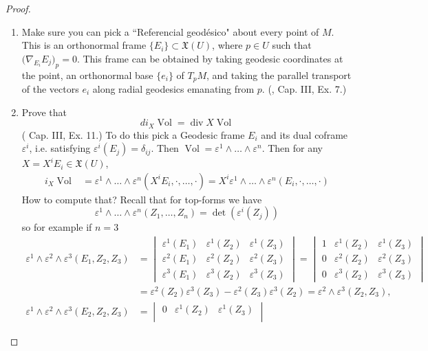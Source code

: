 \begin{proof}\leavevmode
\begin{enumerate}[label=\textbf{Step \arabic*}]
\item Make sure you can pick a ``Referencial geodésico" about every point of \(M\). This is an orthonormal frame \(\{E_i\} \subset \mathfrak{X}(U)\), where \(p \in U\) such that \(\Big(\nabla_{E_i}E_j\Big)_p=0\). This frame can be obtained by taking geodesic coordinates at the point, an orthonormal base \(\{e_i\}\) of \(T_pM\), and taking the parallel transport of the vectors \(e_i\) along radial geodesics emanating from \(p\). (\cite{doc}, Cap. III, Ex. 7.)

\item Prove that \[di_X \operatorname{Vol}=\operatorname{div}X \operatorname{Vol}\] (\cite{doc} Cap. III, Ex. 11.) To do this pick a Geodesic frame \(E_i\) and its dual coframe \(\varepsilon^i\), i.e. satisfying \(\varepsilon^i(E_j)=\delta_{ij}\). Then \(\operatorname{Vol}=\varepsilon^1 \wedge \ldots \wedge \varepsilon^n\). Then for any \(X=X^iE_i \in \mathfrak{X}(U)\),
	\begin{align*}
	i_X\operatorname{Vol}&=\varepsilon^1\wedge\ldots\wedge\varepsilon^n(X^iE_i,\cdot,\ldots,\cdot)=X^i\varepsilon^1\wedge\ldots\wedge\varepsilon^n(E_i,\cdot,\ldots,\cdot)
	\end{align*}
	How to compute that? Recall that for top-forms we have
	\[\varepsilon^1\wedge\ldots\wedge\varepsilon^n(Z_1,\ldots,Z_n)=\det(\varepsilon^i(Z_j))\]
	so for example if \(n=3\)
	\begin{align*}\varepsilon^1\wedge \varepsilon^2\wedge\varepsilon^3(E_1,Z_2,Z_3)&=\begin{vmatrix} \varepsilon^1(E_1)&\varepsilon^1(Z_2) &\varepsilon^1(Z_3)\\
\varepsilon^2(E_1)&\varepsilon^2(Z_2)&\varepsilon^2(Z_3)\\
\varepsilon^3(E_1)&\varepsilon^3(Z_2)&\varepsilon^3(Z_3)
	\end{vmatrix}=\begin{vmatrix} 1&\varepsilon^1(Z_2) &\varepsilon^1(Z_3)\\
0&\varepsilon^2(Z_2)&\varepsilon^2(Z_3)\\
0&\varepsilon^3(Z_2)&\varepsilon^3(Z_3)
	\end{vmatrix}\\
	&=\varepsilon^2(Z_2)\varepsilon^3(Z_3)-\varepsilon^2(Z_3)\varepsilon^3(Z_2)=\varepsilon^2\wedge\varepsilon^3(Z_2,Z_3),\\
	\varepsilon^1\wedge\varepsilon^2\wedge\varepsilon^3(E_2,Z_2,Z_3)&=\begin{vmatrix} 0&\varepsilon^1(Z_2) &\varepsilon^1(Z_3)\\

\end{vmatrix}
\end{align*}
\end{enumerate}
\end{proof}
